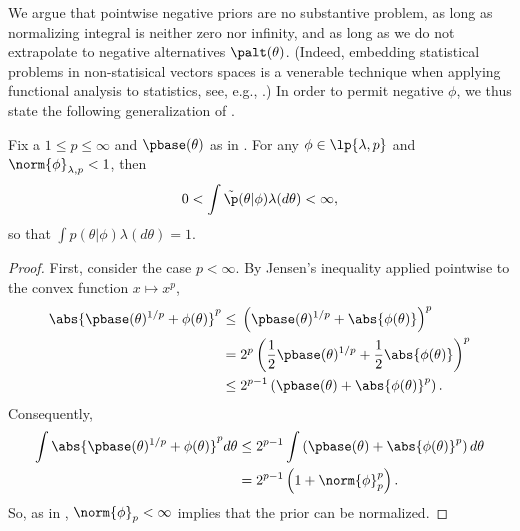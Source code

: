 We argue that pointwise negative priors are no substantive problem, as long as
normalizing integral is neither zero nor infinity, and as long as we do not
extrapolate to negative alternatives $\palt(\theta)$.  (Indeed, embedding
statistical problems in non-statisical vectors spaces is a venerable technique
when applying functional analysis to statistics, see, e.g., \citet[Chapter
6]{serfling:2009:approximation}.)  In order to permit negative $\phi$, we thus
state the following generalization of \citep[Result 2]{gustafson:1996:local}.


\begin{lem}
%
Fix a $1 \le p \le \infty$ and $\pbase(\theta)$ as in .
For any $\phi \in \lp{\lambda,p}$ and $\norm{\phi}_{\lambda,p} < 1$, then
%
\begin{align*}
%
0 < \int \tilde{\p}(\theta \vert \phi) \lambda(d\theta) < \infty,
%
\end{align*}
%
so that $\int p(\theta \vert \phi) \lambda(d\theta) = 1$.
%
\begin{proof}
%
First, consider the case $p < \infty$. By Jensen's inequality applied pointwise
to the convex function $x \mapsto x^p$,
%
\begin{align*}
%
\abs{\pbase(\theta)^{1/p} + \phi(\theta) }^{p} \le{}&
    \left(\pbase(\theta)^{1/p} + \abs{\phi(\theta)} \right)^{p}
\\={}&
    2^p \left(\frac{1}{2}\pbase(\theta)^{1/p} +
              \frac{1}{2} \abs{\phi(\theta)} \right)^{p}
\\\le{}&
    2^{p-1} \left(\pbase(\theta) + \abs{\phi(\theta)}^p \right).
%
\end{align*}
%
Consequently,
%
\begin{align*}
%
\int \abs{\pbase(\theta)^{1/p} + \phi(\theta) }^{p} d\theta \le{}&
    2^{p-1} \int \left(\pbase(\theta) + \abs{\phi(\theta)}^p \right) d\theta
\\={}&
    2^{p-1} \left(1 + \norm{\phi}_p^p\right).
%
\end{align*}
%
So, as in \citep[Result 2]{gustafson:1996:local}, $\norm{\phi}_p < \infty$
implies that the prior can be normalized.


\end{proof}
\end{lem}
